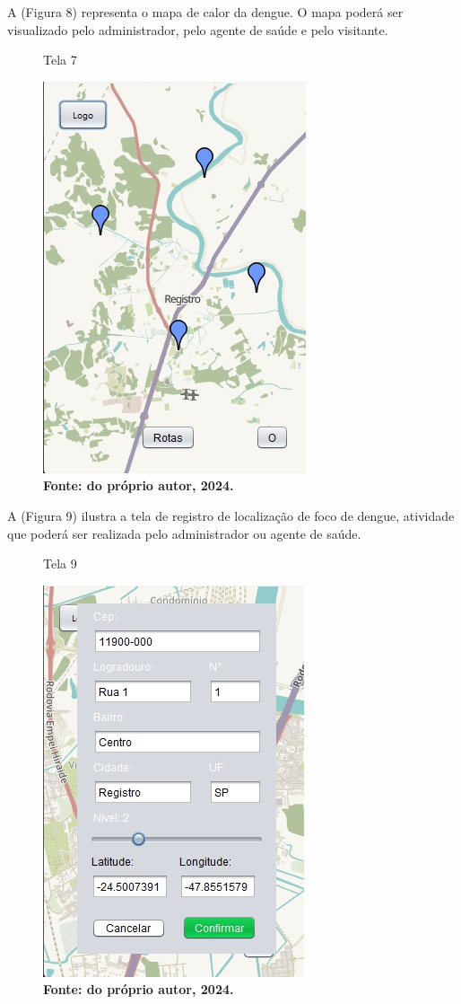 \vspace{12pt}

A (Figura 8) representa o mapa de calor da dengue. O mapa poderá ser visualizado pelo administrador, pelo agente de saúde e pelo visitante. 


\begin{figure}[H]
    \centering
    \caption{Tela 7}
    \includegraphics[width=0.5\linewidth]{Illustrations/mapa_calor.jpg}
    \caption*{\textbf{Fonte: do próprio autor, 2024.}}
\end{figure}

A (Figura 9) ilustra a tela de registro de localização de foco de dengue, atividade que poderá ser realizada pelo administrador ou agente de saúde.

\begin{figure}[H]
    \centering
    \caption{Tela 9}
    \includegraphics[width=0.5\linewidth]{Illustrations/Agt_cad.jpg}
    \caption*{\textbf{Fonte: do próprio autor, 2024.}}
\end{figure}


